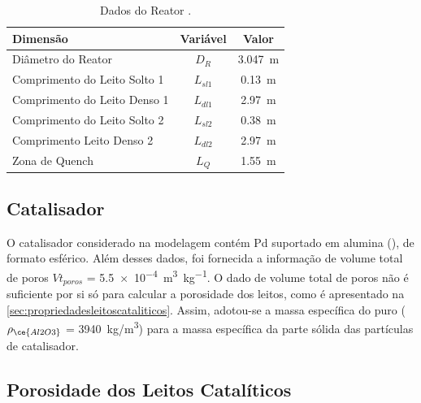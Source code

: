 \begin{table}[!htb]
\begin{center}
\caption{Dados do Reator \cite{Rojas2014a}.}
\label{tab:dadosreator}
\small
\begin{tabular}{lcc}
{Dimensão} & {Variável} & {Valor}
\\
\hline
{Diâmetro do Reator} & {$D_R$} & \SI{3,047}{m} \\
{Comprimento do Leito Solto 1} & {$L_{sl1}$} & \SI{0,13}{m} \\
{Comprimento do Leito Denso 1} & {$L_{dl1}$} & \SI{2,97}{m} \\
{Comprimento do Leito Solto 2} & {$L_{sl2}$} & \SI{0,38}{m} \\
{Comprimento Leito Denso 2} & {$L_{dl2}$} & \SI{2,97}{m} \\
{Zona de Quench} & {$L_{Q}$} & \SI{1,55}{m} \\
\bottomrule
\end{tabular}
\end{center}
\end{table}


\subsection{Catalisador} \label{sec:catalisador}

O catalisador considerado na modelagem contém Pd suportado em alumina
(), de formato esférico. Além desses dados, foi fornecida a informação
de volume total de poros $Vt_{poros}$ = \SI{5,5e-4}{\cubic\meter\per\kg}. O
dado de volume total de poros não é suficiente por si só para calcular a
porosidade dos leitos, como é apresentado na \autoref{sec:propriedadesleitoscataliticos}.
Assim, adotou-se a massa específica do  puro ($\rho_{\ce{Al2O3}}$ =
\SI{3940} {kg/m^3}) para a massa específica da parte sólida das partículas de
catalisador.


\subsection{Porosidade dos Leitos Catalíticos}
\label{sec:propriedadesleitoscataliticos}

